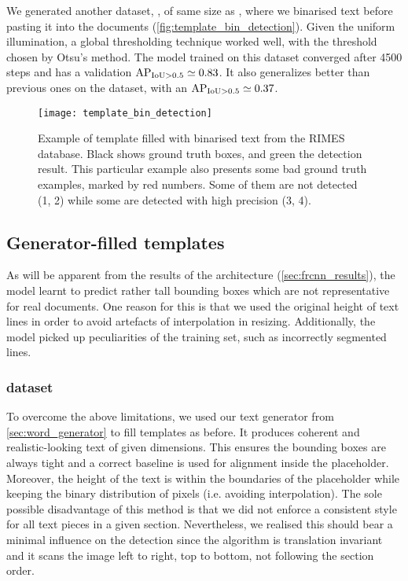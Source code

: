 			We generated another dataset, , of same size as , where we binarised text before pasting it into the documents (\autoref{fig:template_bin_detection}). Given the uniform illumination, a global thresholding technique worked well, with the threshold chosen by Otsu's method. The model trained on this dataset converged after 4500 steps and has a validation \(\operatorname{\operatorname{AP}_{\operatorname{IoU} > 0.5}} \simeq 0.83 \). It also generalizes better than previous ones on the  dataset, with an \(\operatorname{\operatorname{AP}_{\operatorname{IoU} > 0.5}} \simeq 0.37\).

			\begin{figure}
				\texttt{[image: template\_bin\_detection]}
				\caption[ example]{Example of template filled with binarised text from the RIMES database. Black shows ground truth boxes, and green the detection result. This particular example also presents some bad ground truth examples, marked by red numbers. Some of them are not detected (1, 2) while some are detected with high precision (3, 4). }
				\label{fig:template_bin_detection}
			\end{figure}

	\subsection{Generator-filled templates}
		As will be apparent from the results of the \FRCNN{} architecture (\autoref{sec:frcnn_results}), the model learnt to predict rather tall bounding boxes which are not representative for real documents. One reason for this is that we used the original height of text lines in order to avoid artefacts of interpolation in resizing. Additionally, the model picked up peculiarities of the training set, such as incorrectly segmented lines.


		\subsubsection*{ dataset}

			To overcome the above limitations, we used our text generator from \autoref{sec:word_generator} to fill templates as before. It produces coherent and realistic-looking text of given dimensions. This ensures the bounding boxes are always tight and a correct baseline is used for alignment inside the placeholder. Moreover, the height of the text is within the boundaries of the placeholder while keeping the binary distribution of pixels (i.e. avoiding interpolation). The sole possible disadvantage of this method is that we did not enforce a consistent style for all text pieces in a given section. Nevertheless, we realised this should bear a minimal influence on the detection since the algorithm is translation invariant and it scans the image left to right, top to bottom, not following the section order.

